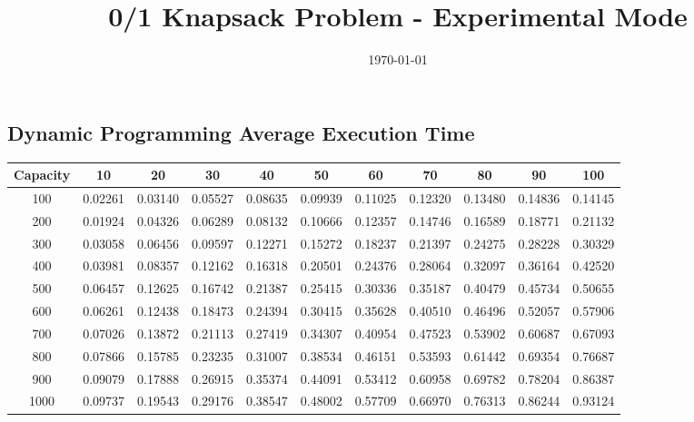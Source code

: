 \documentclass{article}
\title{0/1 Knapsack Problem - Experimental Mode}
\date{\today}
\begin{document}
\maketitle

\subsection{Dynamic Programming Average Execution Time}
\begin{center}
\begin{tabular}{ccccccccccc}
\toprule
Capacity & 10 & 20 & 30 & 40 & 50 & 60 & 70 & 80 & 90 & 100 \\
\midrule
100 & 0.02261 & 0.03140 & 0.05527 & 0.08635 & 0.09939 & 0.11025 & 0.12320 & 0.13480 & 0.14836 & 0.14145 \\
200 & 0.01924 & 0.04326 & 0.06289 & 0.08132 & 0.10666 & 0.12357 & 0.14746 & 0.16589 & 0.18771 & 0.21132 \\
300 & 0.03058 & 0.06456 & 0.09597 & 0.12271 & 0.15272 & 0.18237 & 0.21397 & 0.24275 & 0.28228 & 0.30329 \\
400 & 0.03981 & 0.08357 & 0.12162 & 0.16318 & 0.20501 & 0.24376 & 0.28064 & 0.32097 & 0.36164 & 0.42520 \\
500 & 0.06457 & 0.12625 & 0.16742 & 0.21387 & 0.25415 & 0.30336 & 0.35187 & 0.40479 & 0.45734 & 0.50655 \\
600 & 0.06261 & 0.12438 & 0.18473 & 0.24394 & 0.30415 & 0.35628 & 0.40510 & 0.46496 & 0.52057 & 0.57906 \\
700 & 0.07026 & 0.13872 & 0.21113 & 0.27419 & 0.34307 & 0.40954 & 0.47523 & 0.53902 & 0.60687 & 0.67093 \\
800 & 0.07866 & 0.15785 & 0.23235 & 0.31007 & 0.38534 & 0.46151 & 0.53593 & 0.61442 & 0.69354 & 0.76687 \\
900 & 0.09079 & 0.17888 & 0.26915 & 0.35374 & 0.44091 & 0.53412 & 0.60958 & 0.69782 & 0.78204 & 0.86387 \\
1000 & 0.09737 & 0.19543 & 0.29176 & 0.38547 & 0.48002 & 0.57709 & 0.66970 & 0.76313 & 0.86244 & 0.93124 \\
\bottomrule
\end{tabular}
\end{center}
\end{document}
